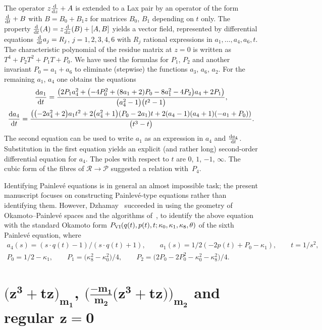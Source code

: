 \documentclass[pdftex]{sigma}
\numberwithin{equation}{section}
\begin{document}
 The operator $z\frac{{\rm d}}{{\rm d}z}+A$ is extended to a Lax pair by an operator of the form $\frac{{\rm d}}{{\rm d}t}+B$ with $B=B_0+B_1z$ for matrices $B_0$, $B_1$ depending on $t$ only. The property $\frac{{\rm d}}{{\rm d}t}(A)=z\frac{{\rm d}}{{\rm d}z}(B)+[A,B]$ yields a vector field, represented by differential equations
 $\frac{{\rm d}}{{\rm d}t}a_j=R_j$, $ j=1,2,3,4,6$ with $R_j$ rational expressions in $a_1,\dots, a_4, a_6,t$. The characteristic polynomial of the residue matrix at $z=0$ is written as $T^4+P_2T^2+P_1T+P_0$. We have used the formulas for $P_1$, $P_2$ and another invariant $P_0=a_1+a_6$ to
 eliminate (stepwise) the functions $a_3$, $a_6$, $a_2$. For the remaining $a_1$, $a_4$ one obtains the equations
\begin{gather*}
\frac{{\rm d}a_1}{{\rm d}t}= \frac{\bigl(2P_1a_4^2 + \bigl(-4P_0^2 + (8a_1 + 2)P_0 - 8a_1^2 - 4P_2\bigr)a_4 + 2P_1\bigr)}{\bigl(a_4^2 - 1\bigr)\bigl(t^2 - 1\bigr)}, \\
 \frac{{\rm d}a_4}{{\rm d}t}= \frac{ \bigl(\bigl(-2a_4^2 + 2\bigr)a_1t^2 + 2\bigl(a_4^2 + 1\bigr)(P_0 - 2a_1)t + 2(a_4 - 1)(a_4 + 1)(-a_1 + P_0))} {\bigl(t^3 - t\bigr)}.
 \end{gather*}
The second equation can be used to write $a_1$ as an expression in $a_4$ and $\frac{{\rm d}a_4}{{\rm d}t}$. Substitution in the first equation
yields an explicit (and rather long) second-order differential equation for $a_4$. The poles with respect to $t$ are $0$, $1$, $-1$, $\infty$.
The cubic form of the fibres of $\mathcal{R}\rightarrow \mathcal{P}$ suggested a relation with~$P_4$.

 Identifying Painlev\'e equations is in general an almost impossible task; the present manuscript focuses on constructing Painlev\'e-type equations rather than identifying them. However, Dzha\-may~\cite{Dz} succeeded in using the
 geometry of Okamoto--Painlev\'e spaces and the algorithms of~\cite{D-F-L-S}, to identify the above equation with
 the standard Okamoto form $P_{\rm VI}(q(t), p(t), t; \kappa_0, \kappa_1, \kappa_8, \allowbreak\theta)$ of the sixth Painlev\'e
 equation, where
\begin{gather*}
a_4(s) = (s\cdot q(t) - 1)/(s \cdot q(t) + 1), \qquad a_1(s) = 1/2 (-2 p(t) + P_0 - \kappa_1 ),\qquad
t = 1/s^2,\\
 P_0 = 1/2 - \kappa_1,\qquad P_1 = \bigl(\kappa_8^2 - \kappa_0^2\bigr)/4,\qquad P_2 = \bigl(2P_0 - 2P_0^2 - \kappa_0^2 - \kappa_8^2\bigr)/4.
 \end{gather*}

\section[(z-cubed plus tz) with multiplicity m1, -m1*(z-cubed plus tz)/m2 with multiplicity m2 and regular z=0]{$\boldsymbol{\bigl(z^3+tz\bigr)_{m_1}}$, $\boldsymbol{\bigl(\frac{-m_1}{m_2}\bigl(z^3+tz\bigr)\bigr)_{m_2}}$ and regular $\boldsymbol{z=0}$}\label{six}
\end{document}
